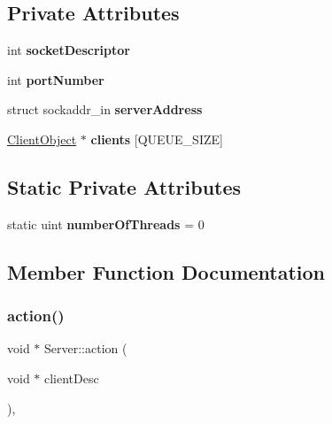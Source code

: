 \subsection*{Private Attributes}
\begin{DoxyCompactItemize}
\item 
\mbox{\label{classServer_a5e52b598760882795a7ea0aada7cb9b7}} 
int {\bfseries socket\+Descriptor}
\item 
\mbox{\label{classServer_a72256f23fe1dbb301a6a19e440f5d089}} 
int {\bfseries port\+Number}
\item 
\mbox{\label{classServer_a0a84291035718de02da7e2c4e661f2a1}} 
struct sockaddr\+\_\+in {\bfseries server\+Address}
\item 
\mbox{\label{classServer_aa42c032945475fb74337637be7a5f928}} 
\hyperlink{classClientObject}{Client\+Object} $\ast$ {\bfseries clients} \mbox{[}Q\+U\+E\+U\+E\+\_\+\+S\+I\+ZE\mbox{]}
\end{DoxyCompactItemize}
\subsection*{Static Private Attributes}
\begin{DoxyCompactItemize}
\item 
\mbox{\label{classServer_ab11a1028476d4235bf3a2d8f468d2b81}} 
static uint {\bfseries number\+Of\+Threads} = 0
\end{DoxyCompactItemize}


\subsection{Member Function Documentation}
\mbox{\label{classServer_a75b8fdcfd5e0438efe7bb79b317caa16}} 
\subsubsection{\texorpdfstring{action()}{action()}}
{\footnotesize\ttfamily void $\ast$ Server\+::action (\begin{DoxyParamCaption}\item[{void $\ast$}]{client\+Desc }\end{DoxyParamCaption})\hspace{0.3cm}{\ttfamily [static]}, {\ttfamily [private]}}




